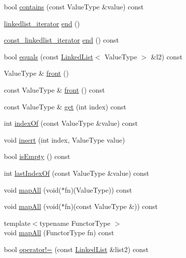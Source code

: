 \begin{DoxyCompactItemize}
\item 
bool \mbox{\hyperlink{classLinkedList_a6fbc1a150987e7e5320d244a3baeb560}{contains}} (const Value\+Type \&value) const
\item 
\mbox{\hyperlink{classLinkedList_1_1linkedlist__iterator}{linkedlist\+\_\+iterator}} \mbox{\hyperlink{classLinkedList_af97c149df5db3e2a35dfeb3797582748}{end}} ()
\item 
\mbox{\hyperlink{classLinkedList_1_1const__linkedlist__iterator}{const\+\_\+linkedlist\+\_\+iterator}} \mbox{\hyperlink{classLinkedList_af3382437fa7ab4f2148e2fa27be4c477}{end}} () const
\item 
bool \mbox{\hyperlink{classLinkedList_a0e2f3f8756f745a9243a086687c414f4}{equals}} (const \mbox{\hyperlink{classLinkedList}{Linked\+List}}$<$ Value\+Type $>$ \&l2) const
\item 
Value\+Type \& \mbox{\hyperlink{classLinkedList_a736a6bda35a26620407e175bee46ae4a}{front}} ()
\item 
const Value\+Type \& \mbox{\hyperlink{classLinkedList_a02aaa52ad7a120201f6dd3e90eff737f}{front}} () const
\item 
const Value\+Type \& \mbox{\hyperlink{classLinkedList_adcb38df411d14f0bd9c14e23947d2e1c}{get}} (int index) const
\item 
int \mbox{\hyperlink{classLinkedList_a619aacfb96804495d3182a7131cf3539}{index\+Of}} (const Value\+Type \&value) const
\item 
void \mbox{\hyperlink{classLinkedList_a01bce249d8a64cd8cb43e7d46cb7b464}{insert}} (int index, Value\+Type value)
\item 
bool \mbox{\hyperlink{classLinkedList_acf82f9b2937375c7b1cf3dccb3df3312}{is\+Empty}} () const
\item 
int \mbox{\hyperlink{classLinkedList_a48d608a1714954f0a7bcac6459483cb6}{last\+Index\+Of}} (const Value\+Type \&value) const
\item 
void \mbox{\hyperlink{classLinkedList_a2931bda025b4800f128f37790d21f49f}{map\+All}} (void($\ast$fn)(Value\+Type)) const
\item 
void \mbox{\hyperlink{classLinkedList_a395b81e6a77aa9702362198771785dfd}{map\+All}} (void($\ast$fn)(const Value\+Type \&)) const
\item 
{\footnotesize template$<$typename Functor\+Type $>$ }\\void \mbox{\hyperlink{classLinkedList_a8dc32c1e45704cfae41daf8adb4e66dc}{map\+All}} (Functor\+Type fn) const
\item 
bool \mbox{\hyperlink{classLinkedList_ae6756397a80197200f1c3fe3bf7dc59f}{operator!=}} (const \mbox{\hyperlink{classLinkedList}{Linked\+List}} \&list2) const

\end{DoxyCompactItemize}
